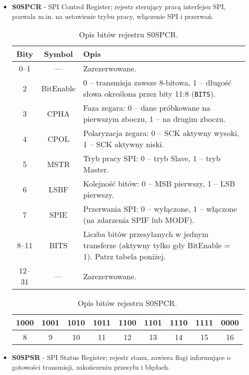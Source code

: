 \begin{itemize}
    \item \textbf{S0SPCR} - SPI Control Register; rejestr sterujący pracą interfejsu SPI, pozwala m.in. na ustawienie trybu pracy, włączenie SPI i przerwań.
\begin{table}[H]
\centering
\caption{Opis bitów rejestru S0SPCR.}
\vspace{0.5em}
\renewcommand{\arraystretch}{1.2}
\begin{tabular}{|c|c|p{9.5cm}|}
\hline
\textbf{Bity} & \textbf{Symbol} & \textbf{Opis} \\
\hline
0–1     & —            & Zarezerwowane. \\
\hline
2       &BitEnable  & 0 – transmisja zawsze 8-bitowa, 1 – długość słowa określona przez bity 11:8 (\texttt{BITS}). \\
\hline
3       &CPHA     & Faza zegara: 0 – dane próbkowane na pierwszym zboczu, 1 – na drugim zboczu. \\
\hline
4       & CPOL       & Polaryzacja zegara: 0 – SCK aktywny wysoki, 1 – SCK aktywny niski. \\
\hline
5       & MSTR       & Tryb pracy SPI: 0 – tryb Slave, 1 – tryb Master. \\
\hline
6       & LSBF       & Kolejność bitów: 0 – MSB pierwszy, 1 – LSB pierwszy. \\
\hline
7       & SPIE       & Przerwania SPI: 0 – wyłączone, 1 – włączone (na zdarzenia SPIF lub MODF). \\
\hline
8–11    & BITS       & Liczba bitów przesyłanych w jednym transferze (aktywny tylko gdy BitEnable = 1). Patrz tabela poniżej. \\
\hline
12–31   & —            & Zarezerwowane. \\
\hline
\end{tabular}

\vspace{1em}

\begin{tabular}{|c|c|c|c|c|c|c|c|c|}
\hline
1000 & 1001 & 1010 & 1011 & 1100 & 1101 & 1110 & 1111 & 0000\\
\hline
8    & 9    & 10   & 11   & 12   & 13   & 14   & 15 & 16\\
\hline
\end{tabular}
\end{table}

    \item \textbf{S0SPSR} - SPI Status Register; rejestr stanu, zawiera flagi informujące o gotowości transmisji, zakończeniu przesyłu i błędach.


\end{itemize}
